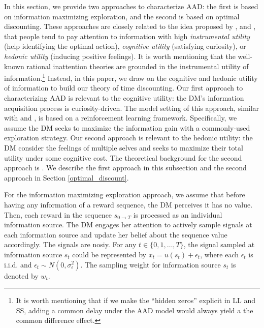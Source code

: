 \documentclass[
  12pt,
]{article}
\begin{document}
In this section, we provide two approaches to characterize AAD: the
first is based on information maximizing exploration, and the second is
based on optimal discounting. These approaches are closely related to
the idea proposed by \citet{gottlieb2012attention},
\citet{gottlieb2013information} and \citet{sharot2020people}, that
people tend to pay attention to information with high \emph{instrumental
utility} (help identifying the optimal action), \emph{cognitive utility}
(satisfying curiosity), or \emph{hedonic utility} (inducing positive
feelings). It is worth mentioning that the well-known rational
inattention theories are grounded in the instrumental utility of
information.\footnote{It is worth mentioning that if we make the
  ``hidden zeros'' explicit in LL and SS, adding a common delay under
  the AAD model would always yield a the common difference effect.}
Instead, in this paper, we draw on the cognitive and hedonic utility of
information to build our theory of time discounting. Our first approach
to characterizing AAD is relevant to the cognitive utility: the DM's
information acquisition process is curiosity-driven. The model setting
of this approach, similar with \citet{gottlieb2012attention} and
\citet{gottlieb2013information}, is based on a reinforcement learning
framework. Specifically, we assume the DM seeks to maximize the
information gain with a commonly-used exploration strategy. Our second
approach is relevant to the hedonic utility: the DM consider the
feelings of multiple selves and seeks to maximize their total utility
under some cognitive cost. The theoretical background for the second
approach is \citet{noor2022optimal,noor2024constrained}. We describe the
first approach in this subsection and the second approach in Section
\ref{optimal_discount}.

For the information maximizing exploration approach, we assume that
before having any information of a reward sequence, the DM perceives it
has no value. Then, each reward in the sequence \(s_{0\rightarrow T}\)
is processed as an individual information source. The DM engages her
attention to actively sample signals at each information source and
update her belief about the sequence value accordingly. The signals are
nosiy. For any \(t\in\{0,1,…,T\}\), the signal sampled at information
source \(s_t\) could be represented by \(x_t =u(s_t)+\epsilon_t\), where
each \(\epsilon_t\) is i.i.d. and
\(\epsilon_t \sim N(0,\sigma_\epsilon^2)\). The sampling weight for
information source \(s_t\) is denoted by \(w_t\).
\end{document}
